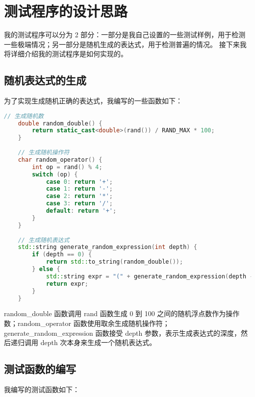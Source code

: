 \documentclass[UTF8]{ctexart}
\begin{document}
\section{测试程序的设计思路}

我的测试程序可以分为 2 部分：一部分是我自己设置的一些测试样例，用于检测一些极端情况；另一部分是随机生成的表达式，用于检测普遍的情况。
接下来我将详细介绍我的测试程序是如何实现的。

\subsection{随机表达式的生成}

为了实现生成随机正确的表达式，我编写的一些函数如下：

\begin{lstlisting}[language=c++, breaklines=true, frame=shadowbox, rulesepcolor=\color{red!20!green!20!blue!20}]
    // 生成随机数
    double random_double() {
        return static_cast<double>(rand()) / RAND_MAX * 100; 
    }
    
    // 生成随机操作符
    char random_operator() {
        int op = rand() % 4;
        switch (op) {
            case 0: return '+';
            case 1: return '-';
            case 2: return '*';
            case 3: return '/';
            default: return '+';
        }
    }
    
    // 生成随机表达式
    std::string generate_random_expression(int depth) {
        if (depth == 0) {
            return std::to_string(random_double());
        } else {
            std::string expr = "(" + generate_random_expression(depth - 1) + random_operator() + generate_random_expression(depth - 1) + ")";
            return expr;
        }
    }    
\end{lstlisting}

random\_double 函数调用 rand 函数生成 0 到 100 之间的随机浮点数作为操作数；random\_operator 函数使用取余生成随机操作符；
generate\_random\_expression 函数接受 depth 参数，表示生成表达式的深度，然后递归调用 depth 次本身来生成一个随机表达式。

\subsection{测试函数的编写}

我编写的测试函数如下：
\end{document}
